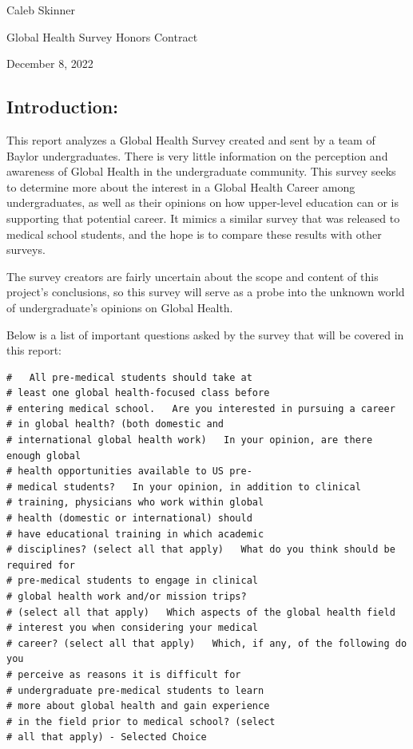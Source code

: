 \documentclass[
  letterpaper,
  DIV=11,
  numbers=noendperiod]{scrartcl}
\author{}
\date{}
\begin{document}
\ifdefined\Shaded\renewenvironment{Shaded}{\begin{tcolorbox}[interior hidden, frame hidden, borderline west={3pt}{0pt}{shadecolor}, breakable, boxrule=0pt, enhanced, sharp corners]}{\end{tcolorbox}}\fi

Caleb Skinner

Global Health Survey Honors Contract

December 8, 2022

\hypertarget{introduction}{%
\subsection{Introduction:}\label{introduction}}

This report analyzes a Global Health Survey created and sent by a team
of Baylor undergraduates. There is very little information on the
perception and awareness of Global Health in the undergraduate
community. This survey seeks to determine more about the interest in a
Global Health Career among undergraduates, as well as their opinions on
how upper-level education can or is supporting that potential career. It
mimics a similar survey that was released to medical school students,
and the hope is to compare these results with other surveys.

The survey creators are fairly uncertain about the scope and content of
this project's conclusions, so this survey will serve as a probe into
the unknown world of undergraduate's opinions on Global Health.

Below is a list of important questions asked by the survey that will be
covered in this report:

\begin{verbatim}
#   All pre-medical students should take at
# least one global health-focused class before
# entering medical school.   Are you interested in pursuing a career
# in global health? (both domestic and
# international global health work)   In your opinion, are there enough global
# health opportunities available to US pre-
# medical students?   In your opinion, in addition to clinical
# training, physicians who work within global
# health (domestic or international) should
# have educational training in which academic
# disciplines? (select all that apply)   What do you think should be required for
# pre-medical students to engage in clinical
# global health work and/or mission trips?
# (select all that apply)   Which aspects of the global health field
# interest you when considering your medical
# career? (select all that apply)   Which, if any, of the following do you
# perceive as reasons it is difficult for
# undergraduate pre-medical students to learn
# more about global health and gain experience
# in the field prior to medical school? (select
# all that apply) - Selected Choice
\end{verbatim}
\end{document}
